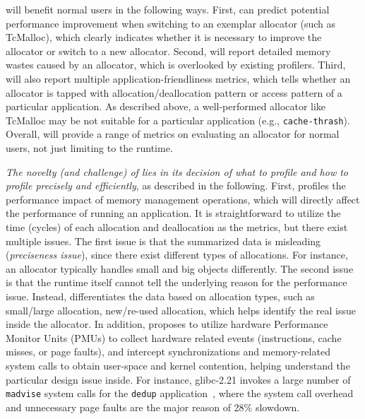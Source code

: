 \MP{} will benefit normal users in the following ways. First, \MP{} can predict potential performance improvement when switching to an exemplar allocator (such as TcMalloc), which clearly indicates whether it is necessary to improve the allocator or switch to a new allocator. Second, \MP{} will report detailed memory wastes caused by an allocator, which is overlooked by existing profilers. Third, \MP{} will also report multiple application-friendliness metrics, which tells whether an allocator is tapped with allocation/deallocation pattern or access pattern of a particular application. As described above, a well-performed allocator like TcMalloc may be not suitable for a particular application (e.g., \texttt{cache-thrash}). Overall, \MP{} will provide a range of metrics on evaluating an allocator for normal users, not just limiting to the runtime. 

\textit{The novelty (and challenge) of \MP{} lies in its decision of what to profile and how to profile precisely and efficiently}, as described in the following. First, \MP{} profiles the performance impact of memory management operations, which will directly affect the performance of running an application. It is straightforward to utilize the time (cycles) of each allocation and deallocation as the metrics, but there exist multiple issues. The first issue is that the summarized data is misleading (\textit{preciseness issue}), since there exist different types of allocations. For instance, an allocator typically handles small and big objects differently. The second issue is that the runtime itself cannot tell the underlying reason for the performance issue. Instead, \MP{} differentiates the data based on allocation types, such as small/large allocation, new/re-used allocation, which helps identify the real issue inside the allocator. In addition, \MP{} proposes to utilize hardware Performance Monitor Units (PMUs) to collect hardware related events (instructions, cache misses, or page faults), and intercept synchronizations and memory-related system calls to obtain user-space and kernel contention, helping understand the particular design issue inside. For instance, glibc-2.21 invokes a large number of \texttt{madvise} system calls for the \texttt{dedup} application~\cite{madvise}, where the system call overhead and unnecessary page faults are the major reason of 28\% slowdown. 

